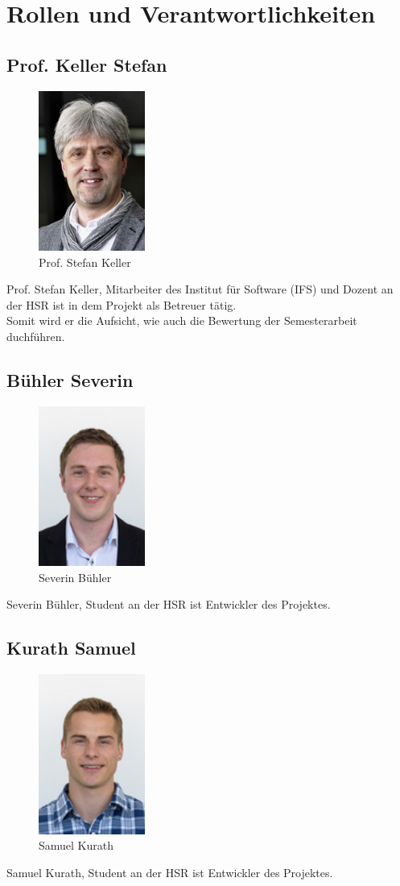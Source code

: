 \section{Rollen und Verantwortlichkeiten}
\subsection{Prof. Keller Stefan}
\begin{figure}[H]
	\centering
	\includegraphics[width=35mm]{images/Skeller.jpg}
	\caption{Prof. Stefan Keller}
\end{figure}

Prof. Stefan Keller, Mitarbeiter des Institut für Software (IFS) und Dozent an
der HSR ist in dem Projekt als Betreuer tätig. \\
Somit wird er die Aufsicht, wie auch die Bewertung der Semesterarbeit duchführen.

\subsection{Bühler Severin}
\begin{figure}[H]
	\centering
	\includegraphics[width=35mm]{images/sbuehler.jpg}
	\caption{Severin Bühler}
\end{figure}
Severin Bühler, Student an der HSR ist Entwickler des Projektes.

\subsection{Kurath Samuel}
\begin{figure}[H]
	\centering
	\includegraphics[width=35mm]{images/skurath.jpg}
	\caption{Samuel Kurath}
\end{figure}
Samuel Kurath, Student an der HSR ist Entwickler des Projektes.
